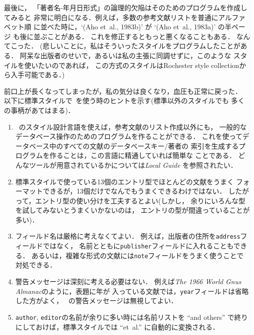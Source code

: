 最後に，
「著者名-年月日形式」の論理的欠陥はそのためのプログラムを作成してみると
非常に明白になる．例えば，多数の参考文献リストを普通にアルファベット順
に並べた時に，`(Aho et~al., 1983b)' が `(Aho et~al., 1983a)' の半ページ
も後に並ぶことがある．
これを修正するともっと悪くなることもある．
なんてこった．
(悲しいことに，私はそういったスタイルをプログラムしたことがある．
阿呆な出版者のせいで，あるいは私の主張に同調せずに，このような
スタイルを使いたいのであれば，
この方式のスタイルはRochester style collectionから入手可能である．)

前口上が長くなってしまったが，私の気分は良くなり，血圧も正常に戻った．
以下に標準スタイルで\BibTeX\ を使う時のヒントを示す(標準以外のスタイルでも
多くの事柄があてはまる)．

\begin{enumerate}

\item
\BibTeX\ のスタイル設計言語を使えば，参考文献のリスト作成以外にも，
一般的なデータベース操作のためのプログラムを作ることができる．
これを使ってデータベース中のすべての文献のデータベースキー/著者の
索引を生成するプログラムを作ることは，この言語に精通していれば簡単な
ことである．
どんなツールが用意されているかについては{\em Local Guide\/}
を参照されたい．

\item
標準スタイルで使っている13個のエントリ型でほとんどの文献をうまく
フォーマットできるが，13個だけでなんでもうまくできるわけではない．
したがって，エントリ型の使い分けを工夫するとよい(しかし，
余りにいろんな型を試してみないとうまくいかないのは，
エントリの型が間違っていることが多い)．

\item
フィールド名は厳格に考えなくてよい．
例えば，出版者の住所を{\tt address}フィールドではなく，
名前とともに{\tt publisher}フィールドに入れることもできる．
あるいは，複雑な形式の文献には{\tt note}フィールドをうまく使うことで
対処できる．

\item
警告メッセージは深刻に考える必要はない．
例えば{\em The 1966 World Gnus Almanac}のように，表題に年が
入っている文献では，{\tt year}フィールドは省略した方がよく，
\BibTeX\ の警告メッセージは無視してよい．

\item
{\tt author}, {\tt editor}の名前が余りに多い時には名前リストを
``and others'' で終りにしておけば，標準スタイルでは
``et~al.'' に自動的に変換される．


\end{enumerate}
